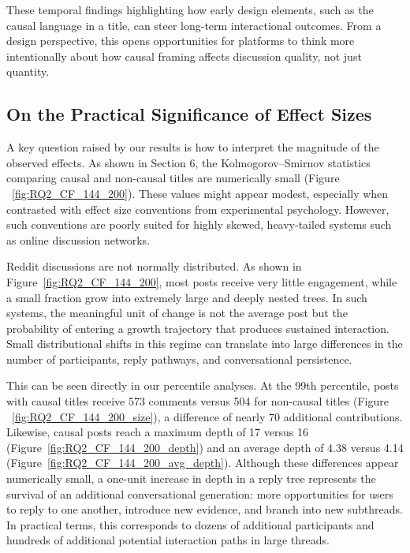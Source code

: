 \documentclass[acmsmall]{acmart}
\begin{document}
These temporal findings highlighting how early design elements, such as the causal language in a title, can steer long-term interactional outcomes. From a design perspective, this opens opportunities for platforms to think more intentionally about how causal framing affects discussion quality, not just quantity.




\subsection{On the Practical Significance of Effect Sizes}

A key question raised by our results is how to interpret the magnitude of the observed effects. As shown in Section 6, the Kolmogorov–Smirnov statistics comparing causal and non-causal titles are numerically small (Figure ~\ref{fig:RQ2_CF_144_200}). These values might appear modest, especially when contrasted with effect size conventions from experimental psychology. However, such conventions are poorly suited for highly skewed, heavy-tailed systems such as online discussion networks.

Reddit discussions are not normally distributed. As shown in Figure~\ref{fig:RQ2_CF_144_200}, most posts receive very little engagement, while a small fraction grow into extremely large and deeply nested trees. In such systems, the meaningful unit of change is not the average post but the probability of entering a growth trajectory that produces sustained interaction. Small distributional shifts in this regime can translate into large differences in the number of participants, reply pathways, and conversational persistence.

This can be seen directly in our percentile analyses. At the 99th percentile, posts with causal titles receive 573 comments versus 504 for non-causal titles (Figure ~\ref{fig:RQ2_CF_144_200_size}), a difference of nearly 70 additional contributions. Likewise, causal posts reach a maximum depth of 17 versus 16 (Figure~\ref{fig:RQ2_CF_144_200_depth}) and an average depth of 4.38 versus 4.14 (Figure~\ref{fig:RQ2_CF_144_200_avg_depth}). Although these differences appear numerically small, a one-unit increase in depth in a reply tree represents the survival of an additional conversational generation: more opportunities for users to reply to one another, introduce new evidence, and branch into new subthreads. In practical terms, this corresponds to dozens of additional participants and hundreds of additional potential interaction paths in large threads.
\end{document}
